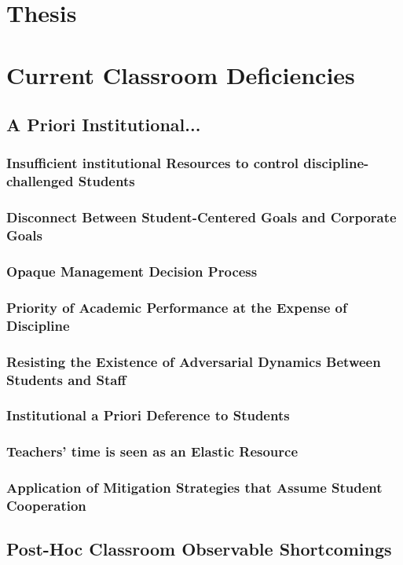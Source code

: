 \documentclass[12pt]{article}
\begin{document}
  \section{Thesis}

  \section{Current Classroom Deficiencies}
  \subsection{A Priori Institutional...}
  \subsubsection{Insufficient institutional Resources to control discipline-challenged Students}
  \subsubsection{Disconnect Between Student-Centered Goals and Corporate Goals}
  \subsubsection{Opaque Management Decision Process}
  \subsubsection{Priority of Academic Performance at the Expense of Discipline}
  \subsubsection{Resisting the Existence of Adversarial Dynamics Between Students and Staff}
  \subsubsection{Institutional a Priori Deference to Students}
  \subsubsection{Teachers' time is seen as an Elastic Resource}
  \subsubsection{Application of Mitigation Strategies that Assume Student Cooperation}

  \subsection{Post-Hoc Classroom Observable Shortcomings}
\end{document}
